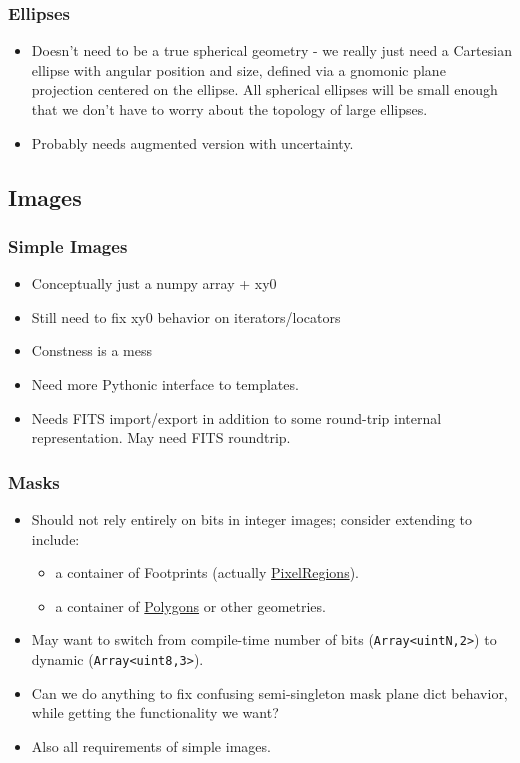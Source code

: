 \subsubsection{Ellipses}
\label{sec:spSphericalEllipses}

\begin{itemize}
\item Doesn't need to be a true spherical geometry - we really just need a Cartesian ellipse with angular position and size, defined via a gnomonic plane projection centered on the ellipse.  All spherical ellipses will be small enough that we don't have to worry about the topology of large ellipses.
\item Probably needs augmented version with uncertainty.
\end{itemize}

\subsection{Images}
\label{sec:spImages}

\subsubsection{Simple Images}
\label{sec:spImagesSimple}

\begin{itemize}
\item Conceptually just a numpy array + xy0
\item Still need to fix xy0 behavior on iterators/locators
\item Constness is a mess
\item Need more Pythonic interface to templates.
\item Needs FITS import/export in addition to some round-trip internal representation.  May need FITS roundtrip.
\end{itemize}

\subsubsection{Masks}
\label{sec:spImagesMasks}

\begin{itemize}
\item Should not rely entirely on bits in integer images; consider extending to include:
    \begin{itemize}
    \item a container of Footprints (actually \hyperref[sec:spFootprintsPixelRegions]{PixelRegions}).
    \item a container of \hyperref[sec:spCartesianPolygons]{Polygons} or other geometries.
    \end{itemize}
\item May want to switch from compile-time number of bits (\verb|Array<uintN,2>|) to dynamic (\verb|Array<uint8,3>|).
\item Can we do anything to fix confusing semi-singleton mask plane dict behavior, while getting the functionality we want?
\item Also all requirements of simple images.
\end{itemize}

